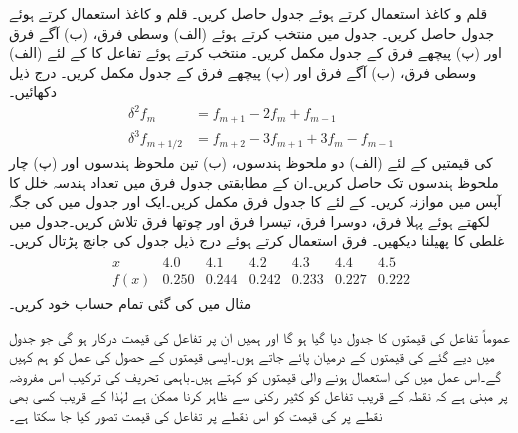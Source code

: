 
\quad
قلم و کاغذ استعمال کرتے ہوئے جدول  حاصل کریں۔
\quad
قلم و کاغذ استعمال کرتے ہوئے جدول  حاصل کریں۔
\quad
جدول  میں  منتخب کرتے ہوئے (الف) وسطی فرق، (ب) آگے فرق اور (پ) پیچھے فرق کے جدول مکمل کریں۔
\quad
{} منتخب کرتے ہوئے تفاعل  کا  کے لئے   (الف) وسطی فرق، (ب) آگے فرق اور (پ) پیچھے فرق کے جدول مکمل کریں۔
\quad
درج ذیل دکھائیں۔
\begin{align*}
\delta^2 f_m&=f_{m+1}-2f_m+f_{m-1}\\
\delta^3 f_{m+1/2}&=f_{m+2}-3f_{m+1}+3f_m-f_{m-1}
\end{align*}
\quad
{} کی قیمتیں  کے لئے (الف) دو ملحوظ ہندسوں، (ب) تین ملحوظ ہندسوں اور (پ) چار ملحوظ ہندسوں تک حاصل کریں۔ان کے مطابقتی جدول فرق میں تعداد ہندسہ خلل کا آپس میں موازنہ کریں۔ 
\quad
{} کے لئے  کا جدول فرق مکمل کریں۔ایک اور جدول میں  کی جگہ  لکھتے ہوئے پہلا فرق، دوسرا فرق، تیسرا فرق اور چوتھا فرق تلاش کریں۔جدول میں غلطی کا پھیلنا دیکھیں۔  
\quad
فرق استعمال کرتے ہوئے درج ذیل جدول کی جانچ پڑتال کریں۔
\begin{align*}
\begin{array}{c|cccccc}
x&4.0&4.1&4.2&4.3&4.4&4.5\\
\hline
f(x)&0.250&0.244&0.242&0.233&0.227&0.222
\end{array}
\end{align*}
\quad
مثال  میں کی گئی  تمام حساب خود کریں۔  

عموماً تفاعل  کی قیمتوں کا جدول دیا گیا ہو گا اور ہمیں ان  پر تفاعل کی قیمت درکار ہو گی جو جدول میں دیے گئے  کی قیمتوں کے درمیان پائے جاتے ہوں۔ایسی قیمتوں کے حصول کی عمل کو ہم  کہیں گے۔اس عمل میں  کی استعمال ہونے والی قیمتوں کو  کہتے ہیں۔باہمی تحریف کی ترکیب اس مفروضہ پر مبنی ہے کہ نقطہ  کے قریب تفاعل  کو کثیر رکنی  سے ظاہر کرنا ممکن ہے لہٰذا  کے قریب کسی بھی نقطے پر  کی قیمت کو اس نقطے پر تفاعل کی قیمت تصور کیا جا سکتا ہے۔

